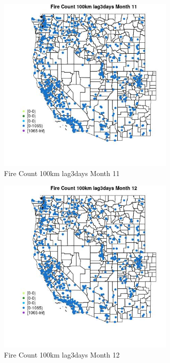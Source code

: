\begin{figure} 
\centering  
\includegraphics[width=0.77\textwidth]{Code_Outputs/Report_ML_input_PM25_Step4_part_f_de_duplicated_aves_prioritize_24hr_obswNAs_MapObsMo11Fire_Count_100km_lag3days.jpg} 
\caption{\label{fig:Report_ML_input_PM25_Step4_part_f_de_duplicated_aves_prioritize_24hr_obswNAsMapObsMo11Fire_Count_100km_lag3days}Fire Count 100km lag3days Month 11} 
\end{figure} 
 

\begin{figure} 
\centering  
\includegraphics[width=0.77\textwidth]{Code_Outputs/Report_ML_input_PM25_Step4_part_f_de_duplicated_aves_prioritize_24hr_obswNAs_MapObsMo12Fire_Count_100km_lag3days.jpg} 
\caption{\label{fig:Report_ML_input_PM25_Step4_part_f_de_duplicated_aves_prioritize_24hr_obswNAsMapObsMo12Fire_Count_100km_lag3days}Fire Count 100km lag3days Month 12} 
\end{figure} 
 

